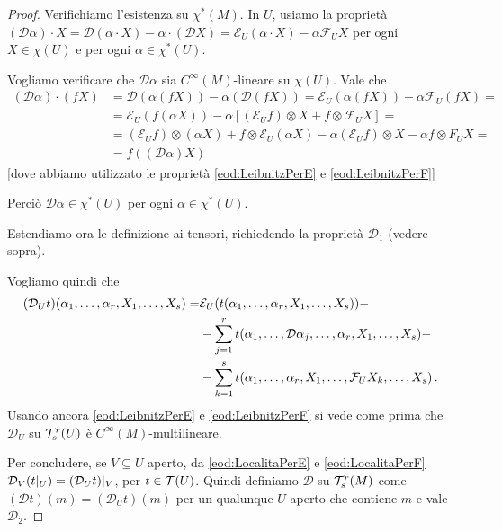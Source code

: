 \begin{proof} %
	Verifichiamo l'esistenza su $\chi^*(M)$. In $U$, usiamo la proprietà $(\mathcal D\alpha)\cdot X = \mathcal D(\alpha\cdot X) - \alpha\cdot(\mathcal D X) = \mathcal E_U(\alpha\cdot X) - \alpha \mathcal F_UX$ per ogni $X\in\chi(U)$ e per ogni $\alpha \in \chi^*(U)$.
	
	Vogliamo verificare che $\mathcal D\alpha$ sia $C^\infty(M)$-lineare su $\chi(U)$.
	Vale che
	\begin{align*}
		(\mathcal D\alpha) \cdot (fX) &= \mathcal D (\alpha(fX)) -\alpha(\mathcal D(fX)) = \mathcal E_U(\alpha(fX)) - \alpha\mathcal F_U(fX)=\\
		&= \mathcal E_U(f(\alpha X)) - \alpha [(\mathcal E_Uf)\otimes X + f \otimes \mathcal F_UX] = \\
		&= (\mathcal E_U f)\otimes (\alpha X) + f \otimes \mathcal E_U (\alpha X) - \alpha (\mathcal E_U f) \otimes X - \alpha f \otimes F_U X = \\
		&= f((\mathcal D\alpha) X)
	\end{align*}
	[dove abbiamo utilizzato le proprietà \ref{eod:LeibnitzPerE} e \ref{eod:LeibnitzPerF}]
	
	Perciò $\mathcal D\alpha \in \chi^*(U)$ per ogni $\alpha\in\chi^*(U)$.

Estendiamo ora le definizione ai tensori, richiedendo la proprietà $\mathcal D_1$ (vedere sopra).

Vogliamo quindi che
\begin{align*}
	(\mathcal D_U t) (\alpha_1,\ldots,\alpha_r,X_1,\ldots,X_s) =& \mathcal E_U(t(\alpha_1,\ldots,\alpha_r,X_1,\ldots,X_s)) -\\
	&-\sum_{j=1}^rt(\alpha_1,\ldots, \mathcal D\alpha_j,\ldots,\alpha_r,X_1,\ldots,X_s) -\\
	&- \sum_{k=1}^s t(\alpha_1,\ldots,\alpha_r,X_1,\ldots,\mathcal F_UX_k,\ldots,X_s)\, \text{. }
\end{align*}
Usando ancora \ref{eod:LeibnitzPerE} e \ref{eod:LeibnitzPerF} si vede come prima che $\mathcal D_U$ su $\mathcal T_s^r(U)$ è $C^\infty(M)$-multilineare.

Per concludere, se $V\subseteq U$ aperto, da \ref{eod:LocalitaPerE} e \ref{eod:LocalitaPerF} $\mathcal D_V(t|_ U) = (\mathcal D_U t)|_ V$, per $t\in\mathcal T(U)$.
Quindi definiamo $\mathcal D$ su $\mathcal T_s^r(M)$ come $(\mathcal D t) (m) = (\mathcal D_U t) (m)$ per un qualunque $U$ aperto che contiene $m$ e vale $\mathcal D_2$.
\end{proof}

